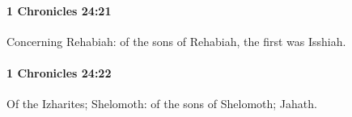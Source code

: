		\paragraph{1 Chronicles 24:21} %
			\label{1CHRONICLES-24-21}

			Concerning Rehabiah: of the sons of Rehabiah, the first was Isshiah.


		\paragraph{1 Chronicles 24:22} %
			\label{1CHRONICLES-24-22}

			Of the Izharites; Shelomoth: of the sons of Shelomoth; Jahath.



